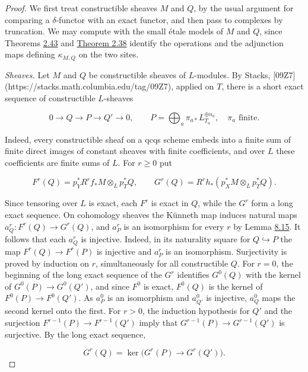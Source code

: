 \documentclass[11pt]{article}
\begin{document}
\begin{proof}[{Proof}]\label{bp696}%
We first treat constructible sheaves \(M\) and \(Q\), by the usual argument for comparing a \(\delta\)-functor with an exact functor, and then pass to complexes by truncation. We may compute with the small étale models of \(M\) and \(Q\), since Theorems \hyperref[bp129]{2.43} and \hyperref[bp113]{Theorem 2.38} identify the operations and the adjunction maps defining \(\kappa_{M,Q}\) on the two sites.

\emph{Sheaves.} Let \(M\) and \(Q\) be constructible sheaves of \(L\)-modules. By Stacks, [09Z7](https://stacks.math.columbia.edu/tag/09Z7), applied on \(T\), there is a short exact sequence of constructible \(L\)-sheaves

\[
0\longrightarrow Q\longrightarrow P\longrightarrow Q'\longrightarrow0,
\qquad
P=\bigoplus_a\pi_{a*}L_{T_a}^{\oplus n_a},
\quad \pi_a\text{ finite}.
\]

Indeed, every constructible sheaf on a qcqs scheme embeds into a finite sum of finite direct images of constant sheaves with finite coefficients, and over \(L\) these coefficients are finite sums of \(L\). For \(r\geq0\) put

\[
F^r(Q)=p_Y^*R^rf_*M\otimes_Lp_T^*Q,
\qquad
G^r(Q)=R^rh_*(p_X^*M\otimes_Lp_T^*Q).
\]

Since tensoring over \(L\) is exact, each \(F^r\) is exact in \(Q\), while the \(G^r\) form a long exact sequence. On cohomology sheaves the Künneth map induces natural maps \(a_Q^r:F^r(Q)\to G^r(Q)\), and \(a_P^r\) is an isomorphism for every \(r\) by Lemma \hyperref[bp692]{8.15}. It follows that each \(a_Q^r\) is injective. Indeed, in its naturality square for \(Q\hookrightarrow P\) the map \(F^r(Q)\to F^r(P)\) is injective and \(a_P^r\) is an isomorphism. Surjectivity is proved by induction on \(r\), simultaneously for all constructible \(Q\). For \(r=0\), the beginning of the long exact sequence of the \(G^r\) identifies \(G^0(Q)\) with the kernel of \(G^0(P)\to G^0(Q')\), and since \(F^0\) is exact, \(F^0(Q)\) is the kernel of \(F^0(P)\to F^0(Q')\). As \(a_P^0\) is an isomorphism and \(a_{Q'}^0\) is injective, \(a^0_Q\) maps the second kernel onto the first. For \(r>0\), the induction hypothesis for \(Q'\) and the surjection \(F^{r-1}(P)\to F^{r-1}(Q')\) imply that \(G^{r-1}(P)\to G^{r-1}(Q')\) is surjective. By the long exact sequence,

\[
G^r(Q)=\ker\bigl(G^r(P)\to G^r(Q')\bigr).
\]


\end{proof}
\end{document}
